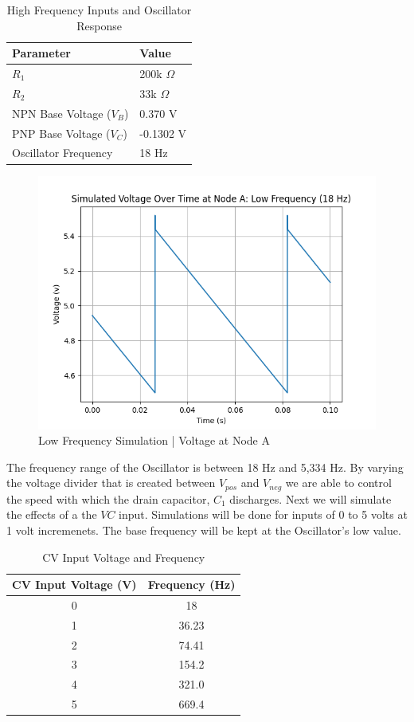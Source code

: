 \documentclass{article}
\begin{document}
\begin{center}
  \begin{table}[H]
    \centering
    \begin{tabular}{ll}
    \toprule
    Parameter & Value \\
    \midrule
    $R_1$ & 200k $\Omega$ \\
    $R_2$ & 33k $\Omega$ \\
    NPN Base Voltage ($V_B$) & 0.370 V \\
    PNP Base Voltage ($V_C$) & -0.1302 V \\
    Oscillator Frequency & 18 Hz \\
    \bottomrule
    \end{tabular}
    \caption{High Frequency Inputs and Oscillator Response}
    \end{table}
\end{center}
\vspace{-1.5cm}
\begin{figure}[H]
  \centering
  \includegraphics[width=.7\linewidth]{png/Figure_2.png}
  \caption{Low Frequency Simulation | Voltage at Node A}
\end{figure}


The frequency range of the Oscillator is between 18 Hz and 5,334 Hz. By varying the voltage divider that is created between $V_{pos}$ and $V_{neg}$ we are able to control the speed with which the drain capacitor, $C_1$ discharges. Next we will simulate the effects of a the $VC$ input. Simulations will be done for inputs of 0 to 5 volts at 1 volt incremenets. The base frequency will be kept at the Oscillator's low value.

\begin{table}[H]
\centering
\begin{tabular}{cc}
\toprule
CV Input Voltage (V) & Frequency (Hz) \\
\midrule
0 & 18 \\
1 & 36.23 \\
2 & 74.41 \\
3 & 154.2 \\
4 & 321.0 \\
5 & 669.4 \\
\bottomrule
\end{tabular}
\caption{CV Input Voltage and Frequency}
\end{table}
\end{document}

